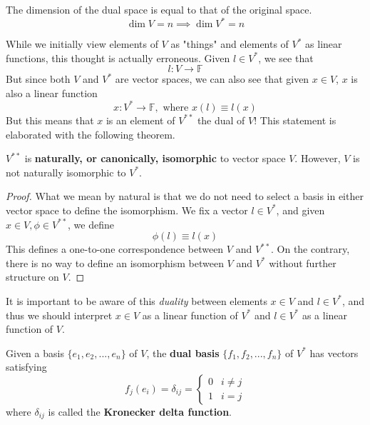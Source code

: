   \begin{theorem}
    The dimension of the dual space is equal to that of the original space. 
    \begin{equation}
      \dim{V} = n \implies \dim{V^*} = n
    \end{equation}
  \end{theorem}

  While we initially view elements of $V$ as "things" and elements of $V^*$ as linear functions, this thought is actually erroneous. Given $l \in V^*$, we see that 
  \begin{equation}
    l: V \longrightarrow \mathbb{F}
  \end{equation}
  But since both $V$ and $V^*$ are vector spaces, we can also see that given $x \in V$, $x$ is also a linear function 
  \begin{equation}
    x: V^* \longrightarrow \mathbb{F}, \text{ where } x(l) \equiv l(x)
  \end{equation}
  But this means that $x$ is an element of $V^{**}$ the dual of $V$! This statement is elaborated with the following theorem. 

  \begin{theorem}
    $V^{**}$ is \textbf{naturally, or canonically, isomorphic} to vector space $V$. However, $V$ is not naturally isomorphic to $V^*$. 
  \end{theorem}
  \begin{proof}
    What we mean by natural is that we do not need to select a basis in either vector space to define the isomorphism. We fix a vector $l \in V^*$, and given $x \in V, \phi \in V^{**}$, we define
    \begin{equation}
      \phi(l) \equiv l(x)
    \end{equation}
    This defines a one-to-one correspondence between $V$ and $V^{**}$. On the contrary, there is no way to define an isomorphism between $V$ and $V^*$ without further structure on $V$. 
  \end{proof}

  It is important to be aware of this \textit{duality} between elements $x \in V$ and $l \in V^*$, and thus we should interpret $x \in V$ as a linear function of $V^*$ and $l \in V^*$ as a linear function of $V$.

  \begin{definition}
    Given a basis $\{ e_1, e_2, ..., e_n\}$ of $V$, the \textbf{dual basis} $\{f_1, f_2, ..., f_n\}$ of $V^*$ has vectors satisfying 
    \begin{equation}
      f_j (e_i) = \delta_{i j} = 
      \begin{cases}
      0 & i \neq j \\
      1 & i = j
      \end{cases}
    \end{equation}
    where $\delta_{i j}$ is called the \textbf{Kronecker delta function}. 
  \end{definition}

